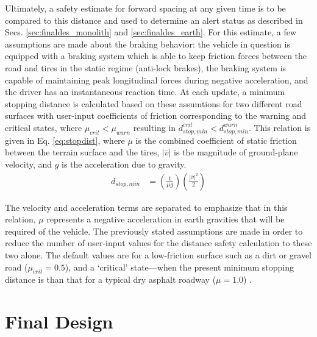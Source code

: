 Ultimately, a safety estimate for forward spacing at any given time is to be compared to this distance and used to determine an alert status as described in Secs. \ref{sec:finaldes_monolith} and \ref{sec:finaldes_earth}. For this estimate, a few assumptions are made about the braking behavior: the vehicle in question is equipped with a braking system which is able to keep friction forces between the road and tires in the static regime (anti-lock brakes), the braking system is capable of maintaining peak longitudinal forces during negative acceleration, and the driver has an instantaneous reaction time. At each update, a minimum stopping distance is calculated based on these assumtions for two different road surfaces with user-input coefficients of friction corresponding to the warning and critical states, where $\mu_{crit}<\mu_{warn}$ resulting in $d_{stop, min}^{crit} < d_{stop, min}^{warn}$. This relation is given in Eq. \eqref{eq:stopdist}, where $\mu$  is the combined coefficient of static friction between the terrain surface and the tires,  $|\bar{v}|$ is the magnitude of ground-plane velocity, and $g$ is the acceleration due to gravity.
\begin{align} \label{eq:stopdist}
    d_{stop, min} &= \left( \frac {1} {\mu g} \right) \left(\frac {|\bar{v}|^2} {2} \right)
\end{align}

The velocity and acceleration terms are separated to emphasize that in this relation, $\mu$ represents a negative acceleration in earth gravities that will be required of the vehicle. The previously stated assumptions are made in order to reduce the number of user-input values for the distance safety calculation to these two alone. The default values are for a low-friction surface such as a dirt or gravel road ($\mu_{crit}=0.5$), and a `critical' state---when the present minimum stopping distance is than that for a typical dry asphalt roadway ($\mu=1.0$) \cite{mu}. 

\section{Final Design} \label{sec:finaldes}

